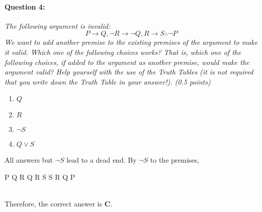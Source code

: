 \documentclass[letterpaper,11pt]{article}
\renewenvironment{fitchproof}
  {\noindent\par\noindent\begin{nd}}
  {\end{nd}\par\noindent\ignorespacesafterend}
\def\ce{\by{{$\rightarrow$}E}}%
\def\mt{\by{MT}}%
\theoremstyle{mytheor}
\begin{document}
\paragraph{Question 4:} \textit{The following argument is invalid:}
\begin{equation*}
    P \rightarrow Q, \neg R \rightarrow \neg Q, R \rightarrow S \therefore \neg P
\end{equation*}
\textit{We want to add another premise to the existing premises of the argument to make it valid. Which one of the following choices works? That is, which one of the following choices, if added to the argument as another premise, would make the argument valid? Help yourself with the use of the Truth Tables (it is not required that you write down the Truth Table in your answer!). (0.5 points)}
\begin{enumerate}[label=\textit{\Alph*:}]
    \item \textit{$Q$}
    \item \textit{$R$}
    \item \textit{$\neg S$}
    \item \textit{$Q \lor S$}
\end{enumerate}
All answers but $\neg S$ lead to a dead end. By $\neg S$ to the premises, 
\begin{framed}
\begin{fitchproof}
     {P \rightarrow Q}
     {\neg R \rightarrow \neg Q}
     {R \rightarrow S}
     {\neg S}
     {\neg R} \mt{3,4}
     {\neg Q} \ce{2,5}
     {\neg P} \mt{1,6}
\end{fitchproof}\\
Therefore, the correct answer is \textbf{C}.
\end{framed}
\end{document}
